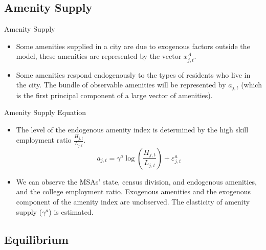 \documentclass[aspectratio=169]{beamer}
\begin{document}

\subsection{Amenity Supply}


\begin{frame}{Amenity Supply}

\begin{itemize}
    \item<1-> Some amenities supplied in a city are due to exogenous factors outside the model, these amenities are represented by the vector $ x_{j,t}^{A} $.
    \item<2-> Some amenities respond endogenously to the types of residents who live in the city.  The bundle of observable amenities will be represented by $ a_{j,t} $ (which is the first principal component of a large vector of amenities).
\end{itemize}
    
\end{frame}


\begin{frame}{Amenity Supply Equation}

\begin{itemize}
    \item<1-> The level of the endogenous amenity index is determined by the high skill employment ratio $ \frac{H_{j,t}}{L_{j,t}} $.
    \begin{equation*}
        a_{j,t} = \gamma^{a} \log \left( \frac{H_{j,t}}{L_{j,t}} \right) + \varepsilon_{j,t}^{a}
    \end{equation*}
    \item<2-> We can observe the MSAs’ state, census division, and endogenous amenities, and the college employment ratio.  Exogenous amenities and the exogenous component of the amenity index are unobserved.  The elasticity of amenity supply ($ \gamma^{a} $) is estimated.
\end{itemize}
    
\end{frame}


\subsection{Equilibrium}
\end{document}
